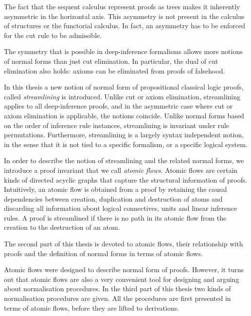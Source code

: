 The fact that the sequent calculus represent proofs as trees makes it inherently asymmetric in the horizontal axis. This asymmetry is not present in the calculus of structures or the functorial calculus. In fact, an asymmetry has to be enforced for the cut rule to be admissible.

The symmetry that is possible in deep-inference formalisms allows more notions of normal forms than just cut elimination. In particular, the dual of cut elimination also holds: axioms can be eliminated from proofs of falsehood.

% 

In this thesis a new notion of normal form of propositional classical logic proofs, called \emph{streamlining} is introduced. Unlike cut or axiom elimination, streamlining applies to all deep-inference proofs, and in the asymmetric case where cut or axiom elimination is applicable, the notions coincide. Unlike normal forms based on the order of inference rule instances, streamlining is invariant under rule permutations. Furthermore, streamlining is a largely syntax independent notion, in the sense that it is not tied to a specific formalism, or a specific logical system.

% 
% 
In order to describe the notion of streamlining and the related normal forms, we introduce a proof invariant that we call \emph{atomic flows}. Atomic flows are certain kinds of directed acyclic graphs that capture the structural information of proofs. Intuitively, an atomic flow is obtained from a proof by retaining the causal dependencies between creation, duplication and destruction of atoms and discarding all information about logical connectives, units and linear inference rules. A proof is streamlined if there is no path in its atomic flow from the creation to the destruction of an atom.

The second part of this thesis is devoted to atomic flows, their relationship with proofs and the definition of normal forms in terms of atomic flows.

Atomic flows were designed to describe normal form of proofs. However, it turns out that atomic flows are also a very convenient tool for designing and arguing about normalisation procedures. In the third part of this thesis two kinds of normalisation procedures are given. All the procedures are first presented in terms of atomic flows, before they are lifted to derivations.

